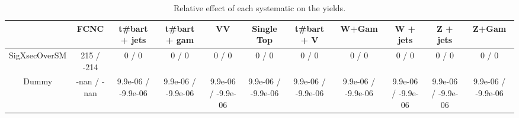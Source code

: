 \begin{table}[htbp]
\begin{center}
\footnotesize
\begin{tabular}{|c|c|c|c|c|c|c|c|c|c|c|}
\hline 
      & FCNC      & t#bar{t} + jets      & t#bar{t} +  gam      & VV      & Single Top      & t#bar{t} + V      & W+Gam      & W + jets      & Z + jets      & Z+Gam \\ 
\hline 
 SigXsecOverSM & 215 / -214 & 0 / 0 & 0 / 0 & 0 / 0 & 0 / 0 & 0 / 0 & 0 / 0 & 0 / 0 & 0 / 0 & 0 / 0 \\ 
  Dummy & -nan / -nan & 9.9e-06 / -9.9e-06 & 9.9e-06 / -9.9e-06 & 9.9e-06 / -9.9e-06 & 9.9e-06 / -9.9e-06 & 9.9e-06 / -9.9e-06 & 9.9e-06 / -9.9e-06 & 9.9e-06 / -9.9e-06 & 9.9e-06 / -9.9e-06 & 9.9e-06 / -9.9e-06 \\ 
\hline 
\end{tabular} 
\caption{Relative effect of each systematic on the yields.} 
\end{center} 
\end{table} 
